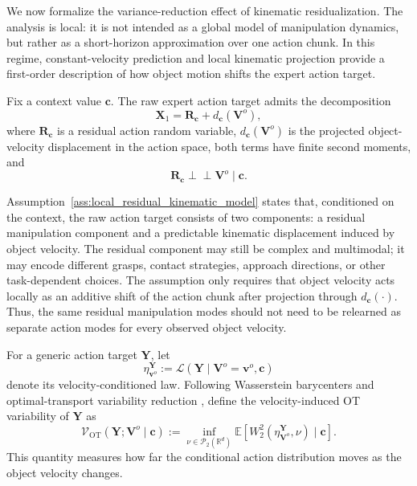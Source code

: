 \documentclass{article} %
\begin{document}
We now formalize the variance-reduction effect of kinematic residualization.
The analysis is local: it is not intended as a global model of manipulation
dynamics, but rather as a short-horizon approximation over one action chunk. In
this regime, constant-velocity prediction and local kinematic projection provide
a first-order description of how object motion shifts the expert action target.

\begin{assumption}
\label{ass:local_residual_kinematic_model}
Fix a context value $\mathbf c$. The raw expert action target admits the
decomposition
\begin{equation}
    \mathbf X_1
    =
    \mathbf R_{\mathbf c}
    +
    d_{\mathbf c}(\mathbf V^{o}),
    \label{eq:local_residual_kinematic_model}
\end{equation}
where $\mathbf R_{\mathbf c}$ is a residual action random variable,
$d_{\mathbf c}(\mathbf V^{o})$ is the projected object-velocity displacement in
the action space, both terms have finite second moments, and
\[
    \mathbf R_{\mathbf c}
    \perp\!\!\!\perp
    \mathbf V^{o}
    \mid
    \mathbf c.
\]
\end{assumption}

Assumption~\ref{ass:local_residual_kinematic_model} states that, conditioned on
the context, the raw action target consists of two components: a residual
manipulation component and a predictable kinematic displacement induced by
object velocity. The residual component may still be complex and multimodal; it
may encode different grasps, contact strategies, approach directions, or other
task-dependent choices. The assumption only requires that object velocity acts
locally as an additive shift of the action chunk after projection through
$d_{\mathbf c}(\cdot)$. Thus, the same residual manipulation modes should not
need to be relearned as separate action modes for every observed object
velocity.

For a generic action target $\mathbf Y$, let
\[
    \eta_{\mathbf v^{o}}^{\mathbf Y}
    :=
    \mathcal L(\mathbf Y \mid \mathbf V^{o}=\mathbf v^{o},\mathbf c)
\]
denote its velocity-conditioned law. Following Wasserstein barycenters and
optimal-transport variability reduction
\citep{agueh2011barycenters,villani2009optimal,hung2022variability}, define the
velocity-induced OT variability of $\mathbf Y$ as
\begin{equation}
    \mathcal V_{\mathrm{OT}}(\mathbf Y;\mathbf V^{o}\mid\mathbf c)
    :=
    \inf_{\nu\in\mathcal P_2(\mathbb R^d)}
    \mathbb E
    \left[
        W_2^2
        \left(
            \eta_{\mathbf V^{o}}^{\mathbf Y},
            \nu
        \right)
        \mid \mathbf c
    \right].
    \label{eq:velocity_ot_variability}
\end{equation}
This quantity measures how far the conditional action distribution moves as the
object velocity changes.
\end{document}
